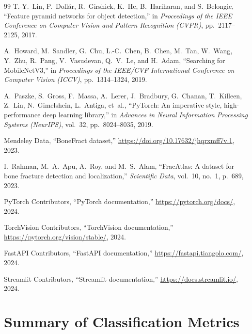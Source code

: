 \documentclass{article}
\begin{document}
\begin{thebibliography}{99}
T.-Y.~Lin, P.~Doll{\'a}r, R.~Girshick, K.~He, B.~Hariharan, and S.~Belongie,
\newblock ``Feature pyramid networks for object detection,''
\newblock in \textit{Proceedings of the IEEE Conference on Computer Vision and Pattern Recognition (CVPR)}, pp.~2117--2125, 2017.

A.~Howard, M.~Sandler, G.~Chu, L.-C.~Chen, B.~Chen, M.~Tan, W.~Wang, Y.~Zhu, R.~Pang, V.~Vasudevan, Q.~V.~Le, and H.~Adam,
\newblock ``Searching for {MobileNetV3},''
\newblock in \textit{Proceedings of the IEEE/CVF International Conference on Computer Vision (ICCV)}, pp.~1314--1324, 2019.

A.~Paszke, S.~Gross, F.~Massa, A.~Lerer, J.~Bradbury, G.~Chanan, T.~Killeen, Z.~Lin, N.~Gimelshein, L.~Antiga, et~al.,
\newblock ``{PyTorch}: An imperative style, high-performance deep learning library,''
\newblock in \textit{Advances in Neural Information Processing Systems (NeurIPS)}, vol.~32, pp.~8024--8035, 2019.

{Mendeley Data},
\newblock ``{BoneFract} dataset,''
\newblock \url{https://doi.org/10.17632/jhqrxmff7v.1}, 2023.

I.~Rahman, M.~A.~Apu, A.~Roy, and M.~S.~Alam,
\newblock ``{FracAtlas}: A dataset for bone fracture detection and localization,''
\newblock \textit{Scientific Data}, vol.~10, no.~1, p.~689, 2023.

{PyTorch Contributors},
\newblock ``{PyTorch} documentation,''
\newblock \url{https://pytorch.org/docs/}, 2024.

{TorchVision Contributors},
\newblock ``{TorchVision} documentation,''
\newblock \url{https://pytorch.org/vision/stable/}, 2024.

{FastAPI Contributors},
\newblock ``{FastAPI} documentation,''
\newblock \url{https://fastapi.tiangolo.com/}, 2024.

{Streamlit Contributors},
\newblock ``{Streamlit} documentation,''
\newblock \url{https://docs.streamlit.io/}, 2024.

\end{thebibliography}

\newpage
\appendix

\section{Summary of Classification Metrics}
\end{document}
